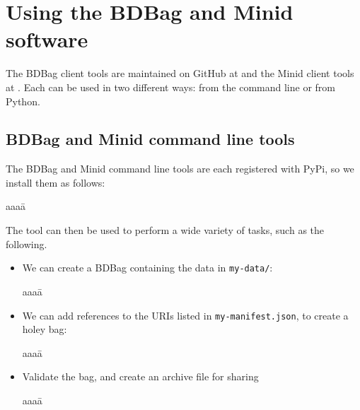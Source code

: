 \documentclass[11pt]{article}
\begin{document}
\section{Using the BDBag and Minid software}

The BDBag client tools are maintained on GitHub at  and the 
Minid client tools at .
Each can be used in two different ways: from the command line or from Python.

\subsection{BDBag and Minid command line tools} 

The BDBag and Minid command line tools are each registered with PyPi, 
so we install them as follows:
\vspace{-1ex}
\begin{tabbing}
aaaa\=\kill
\>\\
\>
\end{tabbing}

\noindent
The  tool can then be used to perform a wide variety of tasks, such as the following.
\begin{itemize}
\item
We can create a BDBag containing the data in \texttt{my-data/}:
\vspace{-2ex}
\begin{tabbing}
aaaa\=\kill
\>
\end{tabbing}

\item
We can add references to the URIs listed in \texttt{my-manifest.json}, to create a holey bag:
\vspace{-2ex}
\begin{tabbing}
aaaa\=\kill
\>
\end{tabbing}

\item
Validate the bag, and create an archive file for sharing
\vspace{-2ex}
\begin{tabbing}
aaaa\=\kill
\>
\end{tabbing}

\end{itemize}
\end{document}
